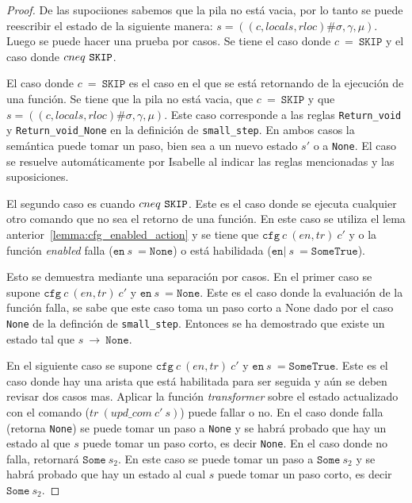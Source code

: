 \begin{proof}
De las supociiones sabemos que la pila no está vacia, por lo tanto se puede reescribir el estado de la siguiente manera: $s = ((c, locals, rloc)\#\sigma,\gamma,\mu)$.
Luego se puede hacer una prueba por casos.
Se tiene el caso donde $c\ =\ \mathtt{SKIP}$ y el caso donde $c\\neq\ \mathtt{SKIP}$.

El caso donde $c\ =\ \mathtt{SKIP}$ es el caso en el que se está retornando de la ejecución de una función.
Se tiene que la pila no está vacia, que $c\ =\ \mathtt{SKIP}$ y que $s = ((c, locals, rloc)\#\sigma,\gamma,\mu)$.
Este caso corresponde a las reglas \verb|Return_void| y \verb|Return_void_None| en la definición de \verb|small_step|.
En ambos casos la semántica puede tomar un paso, bien sea a un nuevo estado $s'$ o a \verb|None|.
El caso se resuelve automáticamente por Isabelle al indicar las reglas mencionadas y las suposiciones.

El segundo caso es cuando $c\\neq\ \mathtt{SKIP}$.
Este es el caso donde se ejecuta cualquier otro comando que no sea el retorno de una función.
En este caso se utiliza el lema anterior~\ref{lemma:cfg_enabled_action} y se tiene que $\mathtt{cfg}\ c\ (en,tr)\ c'$ y o la función \textit{enabled} falla ($\mathtt{en}\ s\ = \mathtt{None}$) o está habilidada ($\mathtt{en}|\ s\ = \mathtt{Some True}$).

Esto se demuestra mediante una separación por casos.
En el primer caso se supone $\mathtt{cfg}\ c\ (en,tr)\ c'$ y $\mathtt{en}\ s\ = \mathtt{None}$.
Este es el caso donde la evaluación de la función falla, se sabe que este caso toma un paso corto a None dado por el caso \verb|None| de la definción de \verb|small_step|.
Entonces se ha demostrado que existe un estado tal que $s\ \rightarrow\ \mathtt{None}$.

En el siguiente caso se supone $\mathtt{cfg}\ c\ (en,tr)\ c'$ y $\mathtt{en}\ s\ = \mathtt{Some True}$.
Este es el caso donde hay una arista que está habilitada para ser seguida y aún se deben revisar dos casos mas.
Aplicar la función \textit{transformer} sobre el estado actualizado con el comando ($tr\ (upd\_com\ c'\ s)$) puede fallar o no.
En el caso donde falla (retorna \verb|None|) se puede tomar un paso a \verb|None| y se habrá probado que hay un estado al que $s$ puede tomar un paso corto, es decir \verb|None|.
En el caso donde no falla, retornará $\mathtt{Some}\ s_{2}$.
En este caso se puede tomar un paso a $\mathtt{Some}\ s_{2}$ y se habrá probado que hay un estado al cual $s$ puede tomar un paso corto, es decir $\mathtt{Some}\ s_{2}$.
\end{proof}

